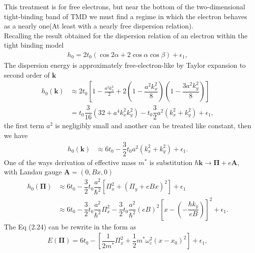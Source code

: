 \documentclass{report}
\newcommand{\f}[2]{\dfrac{#1}{#2}}
\begin{document}
This treatment is for free electrons, but near the bottom of the two-dimensional tight-binding band of TMD we must find a regime in which the electron behaves as a nearly one(At least with a nearly free dispersion relation). \\
Recalling the result obtained for the dispersion relation of an electron within the tight binding model
\begin{gather}
	h_{0} = 2 t_{0} (\cos 2\alpha + 2 \cos \alpha \cos \beta) + \epsilon_{1},
\end{gather}
The dispersion energy is approximately free-electron-like by Taylor expansion to second order of $\mathbf{k}$
\begin{equation}
	\begin{aligned}
		h_{0}(\mathbf{k})
		 & \approx 2 t_{0} \left[1 - \frac{a^{2} k_{x}^{2}}{2} + 2\left(1 - \f{a^{2} k_{x}^{2}}{8}\right)\left(1 - \f{3a^{2} k_{y}^{2}}{8}\right)\right] \\
		 & = t_{0} \f{3}{16} \left(32 + a^{4} k_{x}^{2} k_{y}^{2}\right) - t_{0} \f{3}{2} a^{2}\left(k_{x}^{2} + k_{y}^{2}\right) + \epsilon_{1} ,
	\end{aligned}
\end{equation}
the first term $a^{2}$ is negligibly small and another can be treated like constant, then we have
\begin{equation}
	\begin{aligned}
		h_{0}(\mathbf{k})
		 & \approx 6 t_{0} - \f{3}{2} t_{0} a^{2} (k_{x}^{2} + k_{y}^{2}) + \epsilon_{1}.
	\end{aligned}
\end{equation}
One of the ways derivation of effective mass $m^{*}$ is substitution $\hbar\mathbf{k} \rightarrow \mathbf{\Pi} + e \mathbf{A}$, with Landau gauge $\mathbf{A} = (0,Bx,0)$
\begin{equation}
	\begin{aligned}
		h_{0}(\mathbf{\Pi})
		 & \approx 6 t_{0} - \f{3}{2} t_{0} \f{a^{2}}{\hbar^{2}} \left[ \Pi_{x}^{2} + \left(\Pi_{y} + e B x\right)^{2}\right] + \epsilon_{1}                                                           \\
		 & \approx 6 t_{0} - \f{3}{2} t_{0} \f{a^{2}}{\hbar^{2}} \Pi_{x}^{2} - \f{3}{2} t_{0} \f{a^{2}}{\hbar^{2}} (e B)^{2} \left[ x - \left(- \f{\hbar k_{y}}{eB}\right) \right]^{2} + \epsilon_{1}.
	\end{aligned}
\end{equation}
The Eq (2.24) can be rewrite in the form as
\begin{gather}
	E(\mathbf{\Pi}) = 6 t_{0} - \left[\f{1}{2m^{*}} \Pi_{x}^{2} + \f{1}{2} m^{*} \omega_{c}^{2}(x - x_{0})^{2}\right] + \epsilon_{1},
\end{gather}
\end{document}
